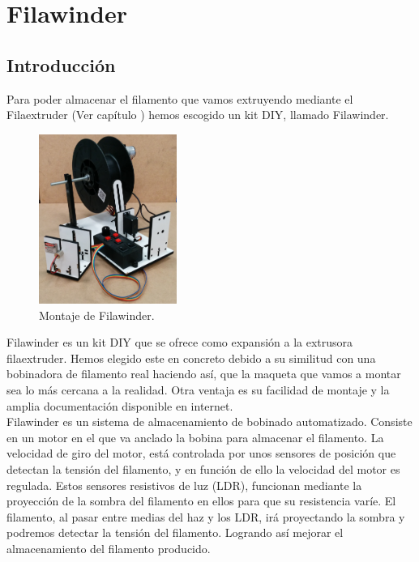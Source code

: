 \chapter{Filawinder}
\label{filawiwnder}
\section{Introducción}
Para poder almacenar el filamento que vamos extruyendo mediante el  Filaextruder (Ver capítulo ) hemos escogido un kit DIY, llamado Filawinder. 

    \begin{figure}[H]
            \centering
            \includegraphics[width=0.4\textwidth]{images/filawinder/fila-winder.jpg}
            \caption{Montaje de Filawinder.}
            \label{fig:winder_winder}
    \end{figure}
Filawinder es un kit DIY que se ofrece como expansión a la extrusora  filaextruder. Hemos elegido este en concreto debido a su similitud con una bobinadora de filamento real haciendo así, que la maqueta que vamos a montar sea lo más cercana a la realidad. Otra ventaja es su facilidad de montaje y la amplia documentación disponible en internet.\\

Filawinder es un sistema de almacenamiento de bobinado automatizado. Consiste en un motor en el que va anclado la bobina para almacenar el filamento. La velocidad de giro del motor, está controlada por unos sensores de posición que detectan la tensión del filamento, y en función de ello la velocidad del motor es regulada. Estos sensores resistivos de luz (LDR), funcionan mediante la proyección de la sombra del filamento en ellos para que su resistencia varíe. El filamento, al pasar entre medias del haz y los LDR, irá proyectando la sombra y podremos detectar la tensión del filamento. Logrando así mejorar el almacenamiento del filamento producido.

